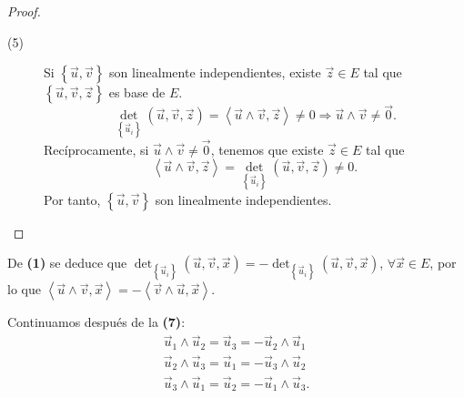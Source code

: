 \begin{proof}
\begin{description}
	\item[(5)] Si $\displaystyle \left\{ \vec{u}, \vec{v}\right\}  $ son linealmente independientes, existe $\displaystyle \vec{z} \in E $ tal que $\displaystyle \left\{ \vec{u}, \vec{v}, \vec{z}\right\}  $ es base de $\displaystyle E $.
		\[\det_{ \left\{ \vec{u}_{i}\right\} }\left(\vec{u}, \vec{v}, \vec{z}\right) = \left\langle \vec{u}\land\vec{v}, \vec{z} \right\rangle \neq 0 \Rightarrow \vec{u} \land \vec{v} \neq \vec{0}.\]
	Recíprocamente, si $\displaystyle \vec{u} \land \vec{v} \neq \vec{0} $, tenemos que existe $\displaystyle \vec{z} \in E $ tal que
	\[\left\langle \vec{u}\land\vec{v}, \vec{z} \right\rangle = \det_{ \left\{ \vec{u}_{i}\right\} }\left(\vec{u}, \vec{v}, \vec{z}\right) \neq 0.\]
	Por tanto, $\displaystyle \left\{ \vec{u}, \vec{v}\right\}  $ son linealmente independientes.
\end{description}
\end{proof}
\begin{observation}
\normalfont De \textbf{(1)} se deduce que $\displaystyle \det_{ \left\{ \vec{u}_{i}\right\} }\left(\vec{u}, \vec{v}, \vec{x}\right) = - \det_{ \left\{ \vec{u}_{i}\right\} }\left(\vec{u}, \vec{v}, \vec{x}\right) $, $\displaystyle \forall \vec{x} \in E $, por lo que $\displaystyle \left\langle \vec{u}\land\vec{v}, \vec{x} \right\rangle = - \left\langle \vec{v}\land\vec{u}, \vec{x} \right\rangle  $.
\end{observation}
\begin{observation}
\normalfont Continuamos después de la \textbf{(7)}:
\[
\begin{split}
\vec{u}_{1} \land \vec{u}_{2} = \vec{u}_{3} = - \vec{u}_{2}\land\vec{u}_{1} \\
\vec{u}_{2}\land\vec{u}_{3} = \vec{u}_{1} = - \vec{u}_{3}\land\vec{u}_{2} \\
\vec{u}_{3}\land\vec{u}_{1} = \vec{u}_{2} = - \vec{u}_{1}\land\vec{u}_{3}.
\end{split}
\]
\end{observation}
